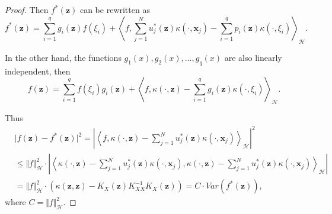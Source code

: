 \documentclass[10pt,a4paper]{amsart}
\begin{document}
\begin{proof}
	Then $f^*(\boldsymbol{z})$ can be rewritten as 
	\begin{equation}
		f^*(\boldsymbol{z}) = \sum\limits_{i = 1}^q  g_i(\boldsymbol{z}) f(\xi_i) +\left\langle f, \sum\limits_{j = 1}^N u_j^*(\boldsymbol{z})\kappa(\cdot,\boldsymbol{x}_j)- \sum\limits_{i= 1}^q p_i(\boldsymbol{z})\kappa(\cdot,\xi_i)\right\rangle_\mathcal{H}. 
	\end{equation}
	
	In the other hand, the functions $g_1(x), g_2(x),\dots,g_q(x)$ are also linearly independent, then 
	\begin{equation}
		f(\boldsymbol{z}) = \sum\limits_{i = 1}^q f(\xi_i) g_i(\boldsymbol{z}) +\left\langle f,\kappa(\cdot,\boldsymbol{z})-\sum\limits_{i= 1}^q g_i(\boldsymbol{z})\kappa(\cdot,\xi_i) \right\rangle_\mathcal{H}.
	\end{equation}
	
	Thus 
	$$
	\begin{aligned}
		&\vert f(\boldsymbol{z}) - f^*(\boldsymbol{z})\vert^2 =\left\vert \left \langle f,\kappa(\cdot,\boldsymbol{z}) - \sum\limits_{j = 1}^N u_j^*(\boldsymbol{z})\kappa(\cdot,\boldsymbol{x}_j) \right \rangle_\mathcal{H} \right\vert^2 \\
		&\le \Vert f\Vert_\mathcal{H}^2 \cdot \left\vert \left \langle \kappa(\cdot,\boldsymbol{z}) - \sum\limits_{j = 1}^N u_j^*(\boldsymbol{z})\kappa(\cdot,\boldsymbol{x}_j), \kappa(\cdot,\boldsymbol{z}) - \sum\limits_{j = 1}^N u_j^*(\boldsymbol{z})\kappa(\cdot,\boldsymbol{x}_j) \right \rangle_\mathcal{H} \right\vert\\
		&= \Vert f\Vert_\mathcal{H}^2 \cdot \left(\kappa(\boldsymbol{z},\boldsymbol{z})- K_X(\boldsymbol{z}) K_{XX}^{-1} K_X(\boldsymbol{z})\right) = C\cdot Var(f^*(\boldsymbol{z})), 
	\end{aligned}
	$$
	where $C =\Vert f\Vert_\mathcal{H}^2$. 
\end{proof}
\end{document}
